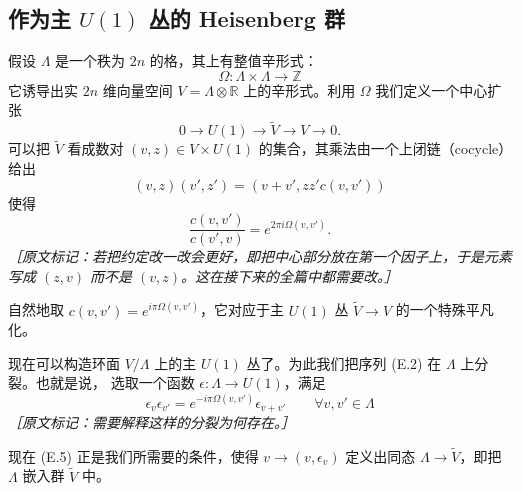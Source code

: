 \subsection{作为主 $U(1)$ 丛的 Heisenberg 群} %

假设 $\Lambda$ 是一个秩为 $2n$ 的格，其上有整值辛形式：
\begin{equation}
  \Omega:\Lambda\times\Lambda\to\mathbb{Z}
  \tag{E.1}
  \label{eq:E.1}
\end{equation}
它诱导出实 $2n$ 维向量空间 $V=\Lambda\otimes\mathbb{R}$ 上的辛形式。利用 $\Omega$ 我们定义一个中心扩张
\begin{equation}
  0\to U(1)\to\tilde V\to V\to 0.
  \tag{E.2}
  \label{eq:E.2}
\end{equation}
可以把 $\tilde V$ 看成数对 $(v,z)\in V\times U(1)$ 的集合，其乘法由一个上闭链（cocycle）给出
\begin{equation}
  (v,z)(v',z') = (v+v',zz'c(v,v'))
  \tag{E.3}
  \label{eq:E.3}
\end{equation}
使得
\begin{equation}
  \frac{c(v,v')}{c(v',v)} = e^{2\pi i\Omega(v,v')}.
  \tag{E.4}
  \label{eq:E.4}
\end{equation}
{\small\itshape ［原文标记：若把约定改一改会更好，即把中心部分放在第一个因子上，于是元素写成
$(z,v)$ 而不是 $(v,z)$。这在接下来的全篇中都需要改。］}

自然地取 $c(v,v')=e^{i\pi\Omega(v,v')}$，它对应于主 $U(1)$ 丛 $\tilde V\to V$ 的一个特殊平凡化。

现在可以构造环面 $V/\Lambda$ 上的主 $U(1)$ 丛了。为此我们把序列 (E.2) 在 $\Lambda$ 上分裂。也就是说，
选取一个函数 $\epsilon:\Lambda\to U(1)$，满足
\begin{equation}
  \epsilon_v\epsilon_{v'} = e^{-i\pi\Omega(v,v')}\epsilon_{v+v'}\qquad \forall v,v'\in\Lambda
  \tag{E.5}
  \label{eq:E.5}
\end{equation}
{\small\itshape ［原文标记：需要解释这样的分裂为何存在。］}

现在 (E.5) 正是我们所需要的条件，使得 $v\to(v,\epsilon_v)$ 定义出同态 $\Lambda\to\tilde V$，即把
$\Lambda$ 嵌入群 $\tilde V$ 中。

